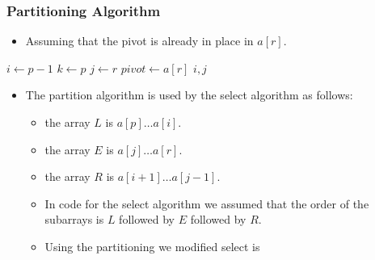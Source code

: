 \documentclass{beamer}
\begin{document}
\begin{frame}
  \frametitle{Partitioning Algorithm}
  \begin{itemize}
  \item Assuming that the pivot is already in place in $a[r]$.
  \end{itemize}
\small{
  \begin{algorithm}[H]
\DontPrintSemicolon
\KwFn \;
$i\gets p-1$\;
$k\gets p$\;
$j\gets r$\;
$pivot\gets a[r]$\;
\Return $i,j$
  \end{algorithm}
}
\end{frame}

\begin{frame}
  \begin{itemize}
  \item The partition algorithm is used by the select algorithm as follows:
    \begin{itemize}
    \item the array $L$ is $a[p]\ldots a[i]$.
    \item the array $E$ is $a[j]\ldots a[r]$.
    \item the array $R$ is $a[i+1]\ldots a[j-1]$.
    \item In code for the select algorithm we assumed that the order of the subarrays is $L$ followed by $E$ followed by $R$.
   \item Using the partitioning we modified select is 
    \end{itemize}
  \end{itemize}
\end{frame}
\end{document}
